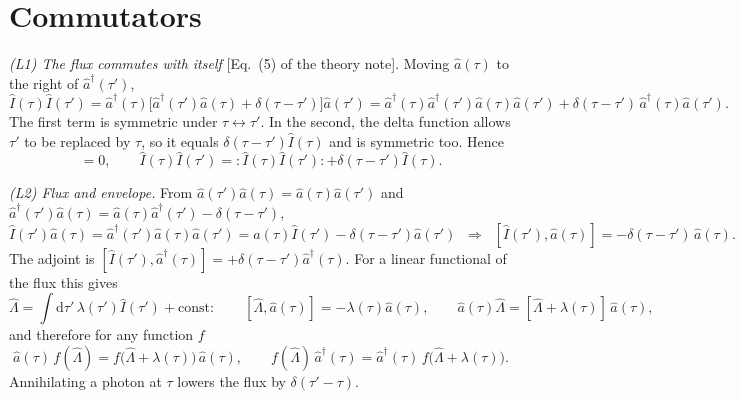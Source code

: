 \documentclass[aps,pra,onecolumn,notitlepage,11pt,amsmath,amssymb,nofootinbib]{revtex4-2}
\newcommand{\Iop}{\hat I}
\newcommand{\dd}{\mathrm{d}}
\begin{document}
\section{Commutators}
\label{sec:comm}

\emph{(L1) The flux commutes with itself} [Eq.~(5) of the theory note].
Moving $\hat a(\tau)$ to the right of $\hat a^\dagger(\tau')$,
\begin{equation}
\Iop(\tau)\Iop(\tau')=\hat a^\dagger(\tau)\big[\hat a^\dagger(\tau')\hat a(\tau)
+\delta(\tau-\tau')\big]\hat a(\tau')
=\hat a^\dagger(\tau)\hat a^\dagger(\tau')\hat a(\tau)\hat a(\tau')
+\delta(\tau-\tau')\,\hat a^\dagger(\tau)\hat a(\tau').
\label{eq:II}
\end{equation}
The first term is symmetric under $\tau\leftrightarrow\tau'$. In the second,
the delta function allows $\tau'$ to be replaced by $\tau$, so it equals
$\delta(\tau-\tau')\Iop(\tau)$ and is symmetric too. Hence
\begin{equation}
[\Iop(\tau),\Iop(\tau')]=0,\qquad
\Iop(\tau)\Iop(\tau')={:}\Iop(\tau)\Iop(\tau'){:}+\delta(\tau-\tau')\Iop(\tau).
\label{eq:L1}
\end{equation}

\emph{(L2) Flux and envelope.} From
$\hat a(\tau')\hat a(\tau)=\hat a(\tau)\hat a(\tau')$ and
$\hat a^\dagger(\tau')\hat a(\tau)=\hat a(\tau)\hat a^\dagger(\tau')-\delta(\tau-\tau')$,
\begin{equation}
\Iop(\tau')\hat a(\tau)=\hat a^\dagger(\tau')\hat a(\tau)\hat a(\tau')
=\hat a(\tau)\Iop(\tau')-\delta(\tau-\tau')\hat a(\tau')
\;\;\Longrightarrow\;\;
[\Iop(\tau'),\hat a(\tau)]=-\delta(\tau-\tau')\,\hat a(\tau).
\label{eq:L2}
\end{equation}
The adjoint is
$[\Iop(\tau'),\hat a^\dagger(\tau)]=+\delta(\tau-\tau')\hat a^\dagger(\tau)$.
For a linear functional of the flux this gives
\begin{equation}
\hat\Lambda=\int\!\dd\tau'\,\lambda(\tau')\Iop(\tau')+\text{const}:\qquad
[\hat\Lambda,\hat a(\tau)]=-\lambda(\tau)\hat a(\tau),\qquad
\hat a(\tau)\hat\Lambda=[\hat\Lambda+\lambda(\tau)]\,\hat a(\tau),
\end{equation}
and therefore for any function $f$
\begin{equation}
\hat a(\tau)\,f(\hat\Lambda)=f\big(\hat\Lambda+\lambda(\tau)\big)\,\hat a(\tau),
\qquad
f(\hat\Lambda)\,\hat a^\dagger(\tau)=\hat a^\dagger(\tau)\,f\big(\hat\Lambda+\lambda(\tau)\big).
\label{eq:shift}
\end{equation}
Annihilating a photon at $\tau$ lowers the flux by $\delta(\tau'-\tau)$.
\end{document}
